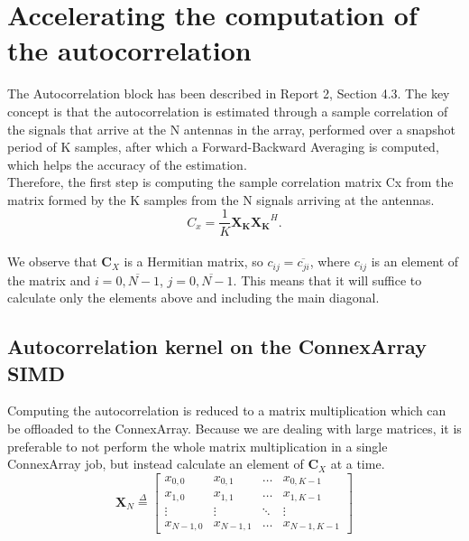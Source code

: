 \section{Accelerating the computation of the autocorrelation}
\label{sec:acc-autocorrelation}

The Autocorrelation block has been described in Report 2, Section 4.3. The key
concept is that the autocorrelation is estimated through a sample correlation of
the signals that arrive at the N antennas in the array, performed over a
snapshot period of K samples, after which a Forward-Backward Averaging is
computed, which helps the accuracy of the estimation. \\

Therefore, the first step is computing the sample correlation matrix Cx from the
matrix formed by the K samples from the N signals arriving at the antennas.
\begin{equation}
C_x = \frac{1}{K}\bm{X_K}\bm{X_K}^H.
\end{equation} \\

We observe that $\bm{C}_X$ is a Hermitian matrix, so $c_{ij} =
\overline{c_{ji}}$, where $c_{ij}$ is an element of the matrix and  $i =
\overline{0, N-1}$, $j = \overline{0, N-1}$. This means that it will suffice to
calculate only the elements above and including the main diagonal.


\subsection{Autocorrelation kernel on the ConnexArray SIMD}
Computing the autocorrelation is reduced to a matrix multiplication which can be
offloaded to the ConnexArray. Because we are dealing with large matrices, it is
preferable to not perform the whole matrix multiplication in a single
ConnexArray job, but instead calculate an element of $\bm{C}_X$ at a time. \\

\begin{equation}
    \bm{X}_N
    \overset{\Delta}{=}
    \begin{bmatrix}
        x_{0,0}   &   x_{0,1}   &   \hdots   &   x_{0,K-1} \\
        x_{1,0}   &   x_{1,1}   &   \hdots   &   x_{1,K-1} \\
        \vdots    &   \vdots    &   \ddots   &   \vdots    \\
        x_{N-1,0} &   x_{N-1,1} &   \hdots   &   x_{N-1,K-1}
    \end{bmatrix}
\end{equation}

